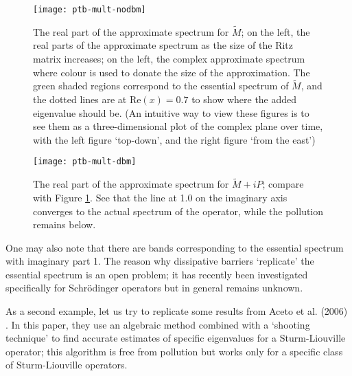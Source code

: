 \documentclass[../main.tex]{subfiles}
\begin{document}
\begin{figure}[p!] 
\texttt{[image: ptb-mult-nodbm]}
\caption{The real part of the approximate spectrum for $\tilde{M}$; on the
	left, the real parts of the approximate
	spectrum as the size of the Ritz matrix increases; on the left, the
	complex approximate spectrum where colour is used to donate the size of
	the approximation. The green shaded regions correspond to the essential
	spectrum of $\tilde{M}$, and the dotted lines are at $\mathrm{Re}(x) =
	0.7$ to show where the added eigenvalue should be. (An intuitive way to
	view these figures is to see them as a three-dimensional plot
	of the complex plane over time, with the left figure `top-down',
	and the right figure `from the east')}
\label{fig:nodbm}
\end{figure}

\begin{figure}[p!] 
\texttt{[image: ptb-mult-dbm]}
\caption{The real part of the approximate spectrum for $\tilde{M}+iP$; compare
	with Figure \ref{fig:nodbm}. See that the line at 1.0 on the imaginary
	axis converges to the actual spectrum of the operator, while the
	pollution remains below.}
\label{fig:dbm}
\end{figure}
\clearpage

\begin{remark}
One may also note that there are bands corresponding to the
essential spectrum with imaginary part 1. The reason why dissipative
barriers `replicate' the essential spectrum is an open problem; it has
recently been investigated specifically for Schr\"odinger operators
\cite{stepanenkoTODO} but in general remains unknown. \end{remark}

As a second example, let us try to replicate some results from Aceto et al.
(2006) \cite{aceto2006numerical}. In this paper, they use an algebraic method
combined with a `shooting technique' to find accurate estimates of specific
eigenvalues for a Sturm-Liouville operator; this algorithm is free from
pollution but works only for a specific class of Sturm-Liouville operators.
\end{document}
